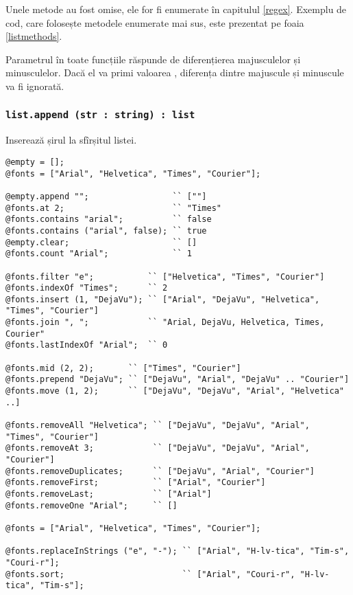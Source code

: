 Unele metode au fost omise, ele for fi enumerate în capitulul \ref{regex}. Exemplu de cod, care folosește metodele enumerate mai sus, este prezentat pe foaia \ref{listmethods}. 

Parametrul  în toate funcțiile răspunde de diferențierea majusculelor și minusculelor. Dacă el va primi valoarea \false, diferența dintre majuscule și minuscule va fi ignorată.

\subsubsection{\lstinline|list.append (str : string) : list|}

Inserează șirul  la sfîrșitul listei.

\newpage
\begin{lstlisting}[caption=Metodele clasei list, label=listmethods]
@empty = [];
@fonts = ["Arial", "Helvetica", "Times", "Courier"];

@empty.append "";                 `` [""]
@fonts.at 2;                      `` "Times"
@fonts.contains "arial";          `` false
@fonts.contains ("arial", false); `` true
@empty.clear;                     `` []
@fonts.count "Arial";             `` 1

@fonts.filter "e";           `` ["Helvetica", "Times", "Courier"]
@fonts.indexOf "Times";      `` 2
@fonts.insert (1, "DejaVu"); `` ["Arial", "DejaVu", "Helvetica", "Times", "Courier"]
@fonts.join ", ";            `` "Arial, DejaVu, Helvetica, Times, Courier"
@fonts.lastIndexOf "Arial";  `` 0

@fonts.mid (2, 2);       `` ["Times", "Courier"]
@fonts.prepend "DejaVu"; `` ["DejaVu", "Arial", "DejaVu" .. "Courier"]
@fonts.move (1, 2);      `` ["DejaVu", "DejaVu", "Arial", "Helvetica" ..]

@fonts.removeAll "Helvetica"; `` ["DejaVu", "DejaVu", "Arial", "Times", "Courier"]
@fonts.removeAt 3;            `` ["DejaVu", "DejaVu", "Arial", "Courier"]
@fonts.removeDuplicates;      `` ["DejaVu", "Arial", "Courier"]
@fonts.removeFirst;           `` ["Arial", "Courier"]
@fonts.removeLast;            `` ["Arial"]
@fonts.removeOne "Arial";     `` []

@fonts = ["Arial", "Helvetica", "Times", "Courier"];

@fonts.replaceInStrings ("e", "-"); `` ["Arial", "H-lv-tica", "Tim-s", "Couri-r"];
@fonts.sort;                        `` ["Arial", "Couri-r", "H-lv-tica", "Tim-s"];
\end{lstlisting}

